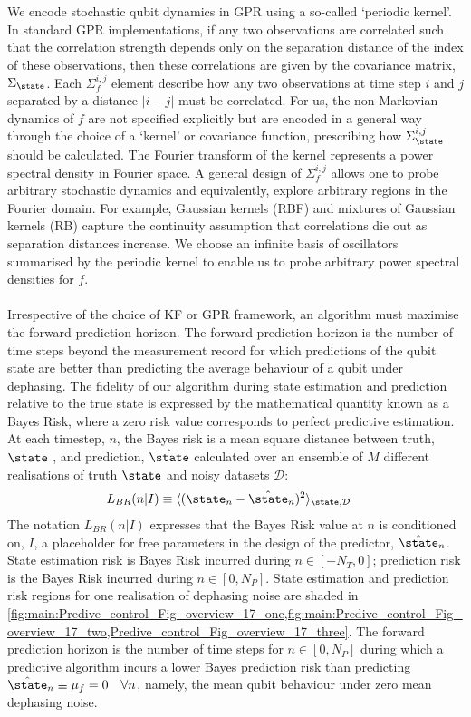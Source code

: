 \\
\\
We encode stochastic qubit dynamics in GPR using a so-called `periodic kernel'. In standard GPR implementations, if any two observations are correlated such that the correlation strength depends only on the separation distance of the index of these observations, then these correlations are given by the covariance matrix, $\Sigma_\state$. Each $\Sigma_f^{i, j}$ element describe how any two observations at time step $i$ and $j$ separated by a distance $|i-j|$ must be correlated. For us, the non-Markovian dynamics of $f$ are not specified explicitly but are encoded in a general way through the choice of a `kernel' or covariance function, prescribing how $\Sigma_\state^{i,j}$ should be calculated. The Fourier transform of the kernel represents a power spectral density in Fourier space. A general design of $\Sigma_f^{i, j}$ allows one to probe arbitrary stochastic dynamics and equivalently, explore arbitrary regions in the Fourier domain. For example, Gaussian kernels (RBF) and mixtures of Gaussian kernels (RB) capture the continuity assumption that correlations die out as separation distances increase. We choose an infinite basis of oscillators summarised by the periodic kernel to enable us to probe arbitrary power spectral densities for $f$.
\\
\\
Irrespective of the choice of KF or GPR framework, an algorithm must maximise the forward prediction horizon. The forward prediction horizon is the number of time steps beyond the measurement record for which predictions of the qubit state are better than predicting the average behaviour of a qubit under dephasing. The fidelity of our algorithm during state estimation and prediction relative to the true state is expressed by the mathematical quantity known as a Bayes Risk, where a zero risk value corresponds to perfect predictive estimation. At each timestep, $n$, the Bayes risk is a mean square distance between truth, $\state$ , and prediction, $\hat{\state}$ calculated over an ensemble of $M$ different realisations of truth $\state$ and noisy datasets $\mathcal{D}$:
\begin{align}
L_{BR}(n | I) & \equiv \langle(\state_n - \hat{\state}_n)^2 \rangle_{\state,\mathcal{D}} \label{eqn:main:sec:ap_opt_LossBR}
\end{align}
The notation $L_{BR}(n | I)$ expresses that the Bayes Risk value at $n$ is conditioned on, $I$, a placeholder for free parameters in the design of the predictor,  $\hat{\state}_n$. State estimation risk is Bayes Risk incurred during $n \in [-N_T, 0]$; prediction risk is the Bayes Risk incurred during $n \in [0, N_P]$. State estimation and prediction risk regions for one realisation of dephasing noise are shaded in \cref{fig:main:Predive_control_Fig_overview_17_one,fig:main:Predive_control_Fig_overview_17_two,Predive_control_Fig_overview_17_three}.  The forward prediction horizon is the number of time steps for $ n \in [0, N_P]$ during which a predictive algorithm incurs a lower Bayes prediction risk than predicting $\hat{\state}_n \equiv \mu_f = 0 \quad \forall n$, namely, the mean qubit behaviour under zero mean dephasing noise. 
